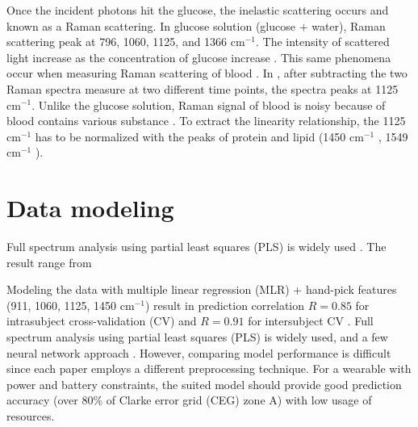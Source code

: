 Once the incident photons hit the glucose, the inelastic scattering occurs and known as a Raman scattering.
In glucose solution (glucose + water), Raman scattering peak at 796, 1060, 1125, and 1366 $\text{cm}^{-1}$.
The intensity of scattered light increase as the concentration of glucose increase \citep{solutionGlucose}. 
This same phenomena occur when measuring Raman scattering of blood \citep{forearm2005, forearm2014, directGlucose, sitecompare}.
In \cite{directGlucose}, after subtracting the two Raman spectra measure at two different time points, the spectra peaks at 1125 $\text{cm}^{-1}$.
Unlike the glucose solution, Raman signal of blood is noisy because of blood contains various substance \citep{ramanNailFold2019}.
To extract the linearity relationship, the 1125 $\text{cm}^{-1}$ has to be normalized with the peaks of protein and lipid (1450 $\text{cm}^{-1}$ \citep{directGlucose}, 1549 $\text{cm}^{-1}$ \citep{solutionGlucose}).

\section{Data modeling}



Full spectrum analysis using partial least squares (PLS)  is widely used \citep{forearm2014, sitecompare, forearm2005, directGlucose}.
The result range from 

Modeling the data with multiple linear regression (MLR) + hand-pick features (911, 1060, 1125, 1450 $\text{cm}^{-1}$) result in prediction correlation $R = 0.85$ for intrasubject cross-validation (CV) and $R = 0.91$ for intersubject CV \citep{directGlucose}.
Full spectrum analysis using partial least squares (PLS) \citep{forearm2014, sitecompare, forearm2005, directGlucose} is widely used, and a few neural network approach \citep{ramanNailFold2019, sitecompare}.
However, comparing model performance is difficult since each paper employs a different preprocessing technique.
For a wearable with power and battery constraints, the suited model should provide good prediction accuracy (over 80\% of Clarke error grid (CEG) zone A) with low usage of resources.



